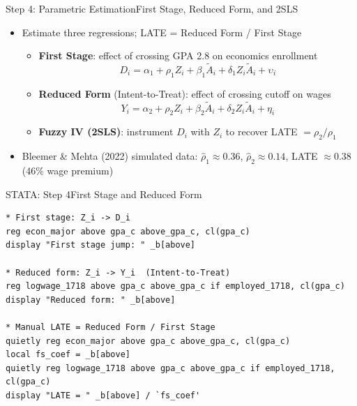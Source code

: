 \documentclass[hyperref={pdfpagelabels=false}]{beamer}
\begin{document}
\begin{frame}{Step 4: Parametric Estimation}{First Stage, Reduced Form, and 2SLS}
	\begin{itemize}
		\item Estimate three regressions; LATE = Reduced Form / First Stage
		\vspace{0.2cm}
		\begin{itemize}
			\item \textbf{First Stage}: effect of crossing GPA 2.8 on economics enrollment
			\begin{equation*}
				D_i = \alpha_1 + \rho_1 Z_i + \beta_1\tilde{A}_i + \delta_1 Z_i\tilde{A}_i + \upsilon_i
			\end{equation*}
			\vspace{0.1cm}
			\item \textbf{Reduced Form} (Intent-to-Treat): effect of crossing cutoff on wages
			\begin{equation*}
				Y_i = \alpha_2 + \rho_2 Z_i + \beta_2\tilde{A}_i + \delta_2 Z_i\tilde{A}_i + \eta_i
			\end{equation*}
			\vspace{0.1cm}
			\item \textbf{Fuzzy IV (2SLS)}: instrument $D_i$ with $Z_i$ to recover LATE $= \rho_2/\rho_1$
		\end{itemize}
		\vspace{0.2cm}
		\item Bleemer \& Mehta (2022) simulated data:
		$\hat{\rho}_1 \approx 0.36$, $\hat{\rho}_2 \approx 0.14$,
		LATE $\approx 0.38$ (46\% wage premium)
	\end{itemize}
\end{frame}


\begin{frame}[fragile]{STATA: Step 4}{First Stage and Reduced Form}
\begin{lstlisting}
* First stage: Z_i -> D_i
reg econ_major above gpa_c above_gpa_c, cl(gpa_c)
display "First stage jump: " _b[above]

* Reduced form: Z_i -> Y_i  (Intent-to-Treat)
reg logwage_1718 above gpa_c above_gpa_c if employed_1718, cl(gpa_c)
display "Reduced form: " _b[above]

* Manual LATE = Reduced Form / First Stage
quietly reg econ_major above gpa_c above_gpa_c, cl(gpa_c)
local fs_coef = _b[above]
quietly reg logwage_1718 above gpa_c above_gpa_c if employed_1718, cl(gpa_c)
display "LATE = " _b[above] / `fs_coef'
\end{lstlisting}
\end{frame}
\end{document}
